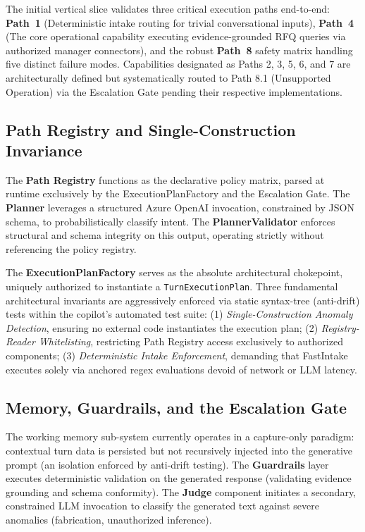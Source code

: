 The initial vertical slice validates three critical execution paths end-to-end: \textbf{Path~1} (Deterministic intake routing for trivial conversational inputs), \textbf{Path~4} (The core operational capability executing evidence-grounded RFQ queries via authorized manager connectors), and the robust \textbf{Path~8} safety matrix handling five distinct failure modes. Capabilities designated as Paths 2, 3, 5, 6, and 7 are architecturally defined but systematically routed to Path 8.1 (Unsupported Operation) via the Escalation Gate pending their respective implementations.

\subsection{Path Registry and Single-Construction Invariance}
The \textbf{Path Registry} functions as the declarative policy matrix, parsed at runtime exclusively by the ExecutionPlanFactory and the Escalation Gate. The \textbf{Planner} leverages a structured Azure OpenAI invocation, constrained by JSON schema, to probabilistically classify intent. The \textbf{PlannerValidator} enforces structural and schema integrity on this output, operating strictly without referencing the policy registry.

The \textbf{ExecutionPlanFactory} serves as the absolute architectural chokepoint, uniquely authorized to instantiate a \texttt{TurnExecutionPlan}. Three fundamental architectural invariants are aggressively enforced via static syntax-tree (anti-drift) tests within the copilot's automated test suite: (1) \textit{Single-Construction Anomaly Detection}, ensuring no external code instantiates the execution plan; (2) \textit{Registry-Reader Whitelisting}, restricting Path Registry access exclusively to authorized components; (3) \textit{Deterministic Intake Enforcement}, demanding that FastIntake executes solely via anchored regex evaluations devoid of network or LLM latency. 

\subsection{Memory, Guardrails, and the Escalation Gate}
The working memory sub-system currently operates in a capture-only paradigm: contextual turn data is persisted but not recursively injected into the generative prompt (an isolation enforced by anti-drift testing). The \textbf{Guardrails} layer executes deterministic validation on the generated response (validating evidence grounding and schema conformity). The \textbf{Judge} component initiates a secondary, constrained LLM invocation to classify the generated text against severe anomalies (fabrication, unauthorized inference).

